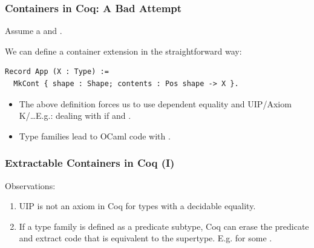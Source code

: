 \begin{frame}[fragile]
  \frametitle{Containers in Coq: A Bad Attempt}
  Assume a  and .
  \vspace{.4cm}

  We can define a container extension in the straightforward way:
  \begin{verbatim}
Record App (X : Type) :=
  MkCont { shape : Shape; contents : Pos shape -> X }.
  \end{verbatim}
  \vspace{.2cm}

  \begin{overprint}
  \begin{center}
  \begin{minipage}{.8\columnwidth}
    \begin{infobox}
      \begin{itemize}
        \item The above definition forces us to use dependent equality and
          UIP/Axiom K/\ldots E.g.: dealing with   if
           and .
        \item Type families lead to OCaml code with .
      \end{itemize}
    \end{infobox}
  \end{minipage}
  \end{center}
  \end{overprint}
\end{frame}

\begin{frame}[fragile]
  \frametitle{Extractable Containers in Coq (I)}

  Observations:
  \begin{enumerate}
    \item UIP is \alert{not an axiom} in Coq for types with a \alert{decidable
      equality}.
    \item If a type family is defined as a \alert{predicate subtype}, Coq can
      erase the predicate and extract code that is equivalent to the supertype.
      E.g.  for some .
  \end{enumerate}
\end{frame}

